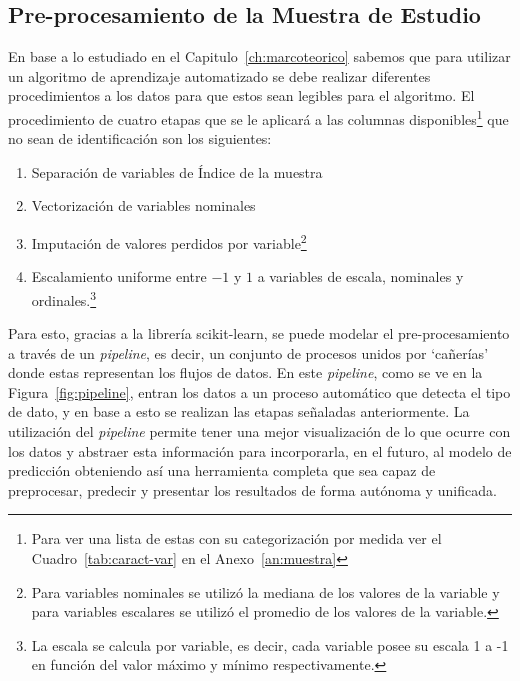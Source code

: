 \subsection{Pre-procesamiento de la Muestra de Estudio}
En base a lo estudiado en el Capitulo~\ref{ch:marcoteorico} sabemos que para utilizar un algoritmo de aprendizaje automatizado se debe realizar diferentes procedimientos a los datos para que estos sean legibles para el algoritmo. El procedimiento de cuatro etapas que se le aplicará a las columnas disponibles\footnote{Para ver una lista de estas con su categorización por medida ver el Cuadro~\ref{tab:caract-var} en el Anexo~\ref{an:muestra}} que no sean de identificación son los siguientes:
\begin{enumerate}[label=\Roman*]
\item Separación de variables de Índice de la muestra
\item Vectorización de variables nominales
\item Imputación de valores perdidos por variable\footnote{Para variables nominales se utilizó la mediana de los valores de la variable y para variables escalares se utilizó el promedio de los valores de la variable. }
\item Escalamiento uniforme entre $-1$ y $1$ a variables de escala, nominales y ordinales.\footnote{La escala se calcula por variable, es decir, cada variable posee su escala 1 a -1 en función del valor máximo y mínimo respectivamente.}
\end{enumerate}

Para esto, gracias a la librería scikit-learn, se puede modelar el pre-procesamiento a través de un \textit{pipeline}, es decir, un conjunto de procesos unidos por `cañerías' donde estas representan los flujos de datos. En este \textit{pipeline}, como se ve en la Figura~\ref{fig:pipeline}, entran los datos a un proceso automático que detecta el tipo de dato, y en base a esto se realizan las etapas señaladas anteriormente. La utilización del \textit{pipeline} permite tener una mejor visualización de lo que ocurre con los datos y abstraer esta información para incorporarla, en el futuro, al modelo de predicción obteniendo así una herramienta completa que sea capaz de preprocesar, predecir y presentar los resultados de forma autónoma y unificada.

